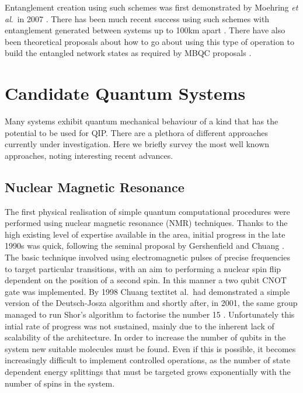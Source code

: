Entanglement creation using such schemes was first demonstrated by Moehring \textit{et al}.\ in 2007 \cite{Moehring:2007p6099}. There has been much recent success using such schemes with entanglement generated between systems up to 100km apart \cite{entanglement_97km_08, entanglement_144km_07}. There have also been theoretical proposals about how to go about using this type of operation to build the entangled network states as required by MBQC proposals \cite{Benjamin:2006p6123}.


\section{Candidate Quantum Systems}

Many systems exhibit quantum mechanical behaviour of a kind that has the potential to be used for QIP. There are a plethora of different approaches currently under investigation. Here we briefly survey the most well known approaches, noting interesting recent advances.

\subsection{Nuclear Magnetic Resonance}

The first physical realisation of simple quantum computational procedures were performed using nuclear magnetic resonance (NMR) techniques. Thanks to the high existing level of expertise available in the area, initial progress in the late 1990s was quick, following the seminal proposal by Gershenfield and Chuang \cite{nmr_proposal_chuang_97}. The basic technique involved using electromagnetic pulses of precise frequencies to target particular transitions, with an aim to performing a nuclear spin flip dependent on the position of a second spin. In this manner a two qubit CNOT gate was implemented. By 1998 Chuang textit{et al}.\ had demonstrated a simple version of the Deutsch-Josza algorithm \cite{chuang_first_nmr_realisation_98} and shortly after, in 2001, the same group managed to run Shor’s algorithm to factorise the number 15 \cite{nmr_factorise_15_01}. Unfortunately this intial rate of progress was not sustained, mainly due to the inherent lack of scalability of the architecture. In order to increase the number of qubits in the system new suitable molecules must be found. Even if this is possible, it becomes increasingly difficult to implement controlled operations, as the number of state dependent energy splittings that must be targeted grows exponentially with the number of spins in the system.

